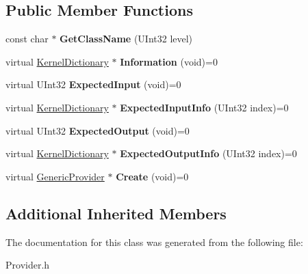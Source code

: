 \subsection*{Public Member Functions}
\begin{DoxyCompactItemize}
\item 
\mbox{\label{class_generic_provider_1_1_factory_a14f7b9bfd314c51a15425e64e871e4ba}} 
const char $\ast$ {\bfseries Get\+Class\+Name} (U\+Int32 level)
\item 
\mbox{\label{class_generic_provider_1_1_factory_a4e5419dabf227fef04089557787efefd}} 
virtual \hyperlink{class_kernel_dictionary}{Kernel\+Dictionary} $\ast$ {\bfseries Information} (void)=0
\item 
\mbox{\label{class_generic_provider_1_1_factory_a8358aa2ab2b2d09c791d1a57ae039be1}} 
virtual U\+Int32 {\bfseries Expected\+Input} (void)=0
\item 
\mbox{\label{class_generic_provider_1_1_factory_ad0c495bd0326c020a569090aa28d2863}} 
virtual \hyperlink{class_kernel_dictionary}{Kernel\+Dictionary} $\ast$ {\bfseries Expected\+Input\+Info} (U\+Int32 index)=0
\item 
\mbox{\label{class_generic_provider_1_1_factory_af27e5ddd34bf68d5b21cfa45c2feef51}} 
virtual U\+Int32 {\bfseries Expected\+Output} (void)=0
\item 
\mbox{\label{class_generic_provider_1_1_factory_a493dc19e38e1d2529536bfb662f96d4f}} 
virtual \hyperlink{class_kernel_dictionary}{Kernel\+Dictionary} $\ast$ {\bfseries Expected\+Output\+Info} (U\+Int32 index)=0
\item 
\mbox{\label{class_generic_provider_1_1_factory_a7e7fac279e81b7a0d1db7a33ab7c4a1a}} 
virtual \hyperlink{class_generic_provider}{Generic\+Provider} $\ast$ {\bfseries Create} (void)=0
\end{DoxyCompactItemize}
\subsection*{Additional Inherited Members}


The documentation for this class was generated from the following file\+:\begin{DoxyCompactItemize}
\item 
Provider.\+h\end{DoxyCompactItemize}
